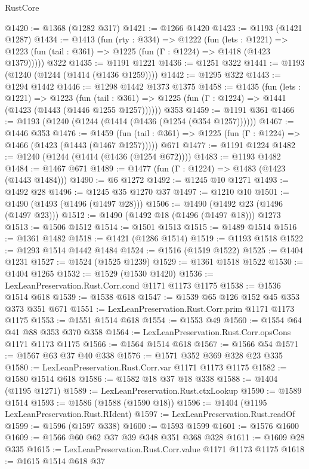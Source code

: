 \begin{lexlean}{RustCore}
\begin{coremodule}
@1420 := @1368 (@1282 @317)
@1421 := @1266 @1420
@1423 := @1193 (@1421 @1287)
@1434 := @1413
    (fun (rty : @334) =>
    @1222
      (fun (lets : @1221) =>
      @1223 (fun (tail : @361) => @1225 (fun (Γ : @1224) => @1418 (@1423 @1379)))))
    @322
@1435 := @1191 @1221
@1436 := @1251 @322
@1441 := @1193 (@1240 (@1244 (@1414 (@1436 @1259))))
@1442 := @1295 @322
@1443 := @1294 @1442
@1446 := @1298 @1442 @1373 @1375
@1458 := @1435
    (fun (lets : @1221) =>
    @1223
      (fun (tail : @361) => @1225 (fun (Γ : @1224) => @1441 (@1423 (@1443 (@1446 @1255 @1257))))))
    @353
@1459 := @1191 @361
@1466 := @1193 (@1240 (@1244 (@1414 (@1436 (@1254 (@354 @1257))))))
@1467 := @1446 @353
@1476 := @1459
    (fun (tail : @361) => @1225 (fun (Γ : @1224) => @1466 (@1423 (@1443 (@1467 @1257)))))
    @671
@1477 := @1191 @1224
@1482 := @1240 (@1244 (@1414 (@1436 (@1254 @672))))
@1483 := @1193 @1482
@1484 := @1467 @671
@1489 := @1477 (fun (Γ : @1224) => @1483 (@1423 (@1443 @1484)))
@1490 := @6 @1272
@1492 := @1245 @10 @1271
@1493 := @1492 @28
@1496 := @1245 @35 @1270 @37
@1497 := @1210 @10
@1501 := @1490 (@1493 (@1496 (@1497 @28)))
@1506 := @1490 (@1492 @23 (@1496 (@1497 @23)))
@1512 := @1490 (@1492 @18 (@1496 (@1497 @18))) @1273
@1513 := @1506 @1512
@1514 := @1501 @1513
@1515 := @1489 @1514
@1516 := @1361 @1482
@1518 := @1421 (@1286 @1514)
@1519 := @1193 @1518
@1522 := @1293 @1514 @1442 @1484
@1524 := @1516 (@1519 @1522)
@1525 := @1404 @1231
@1527 := @1524 (@1525 @1239)
@1529 := @1361 @1518 @1522
@1530 := @1404 @1265
@1532 := @1529 (@1530 @1420)
@1536 := LexLeanPreservation.Rust.Corr.cond @1171 @1173 @1175
@1538 := @1536 @1514 @618
@1539 := @1538 @618
@1547 := @1539 @65 @126 @152 @45 @353 @373 @351 @671
@1551 := LexLeanPreservation.Rust.Corr.prim @1171 @1173 @1175
@1553 := @1551 @1514 @618
@1554 := @1553 @49
@1560 := @1554 @64 @41 @88 @353 @370 @358
@1564 := LexLeanPreservation.Rust.Corr.opsCons @1171 @1173 @1175
@1566 := @1564 @1514 @618
@1567 := @1566 @54
@1571 := @1567 @63 @37 @40 @338
@1576 := @1571 @352 @369 @328 @23 @335
@1580 := LexLeanPreservation.Rust.Corr.var @1171 @1173 @1175
@1582 := @1580 @1514 @618
@1586 := @1582 @18 @37 @18 @338
@1588 := @1404 (@1195 @1271)
@1589 := LexLeanPreservation.Rust.ctxLookup
@1590 := @1589 @1514
@1593 := @1586 (@1588 (@1590 @18))
@1596 := @1404 (@1195 LexLeanPreservation.Rust.RIdent)
@1597 := LexLeanPreservation.Rust.readOf
@1599 := @1596 (@1597 @338)
@1600 := @1593 @1599
@1601 := @1576 @1600
@1609 := @1566 @60 @62 @37 @39 @348 @351 @368 @328
@1611 := @1609 @28 @335
@1615 := LexLeanPreservation.Rust.Corr.value @1171 @1173 @1175
@1618 := @1615 @1514 @618 @37

\end{coremodule}
\end{lexlean}
